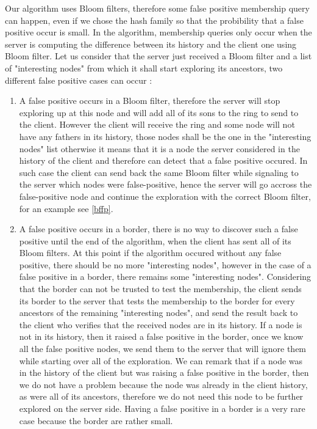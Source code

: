 Our algorithm uses Bloom filters, therefore some false positive membership query can happen, even if we chose the hash family so that the probibility that a false positive occur is small. In the algorithm, membership queries only occur when the server is computing the difference between its history and the client one using Bloom filter. Let us consider that the server just received a Bloom filter and a list of "interesting nodes" from which it shall start exploring its ancestors, two different false positive cases can occur :
\begin{enumerate}
 \item A false positive occurs in a Bloom filter, therefore the server will stop exploring up at this node and will add all of its sons to the ring to send to the client. However the client will receive the ring and some node will not have any fathers in its history, those nodes shall be the one in the "interesting nodes" list otherwise it means that it is a node the server considered in the history of the client and therefore can detect that a false positive occured. In such case the client can send back the same Bloom filter while signaling to the server which nodes were false-positive, hence the server will go accross the false-positive node and continue the exploration with the correct Bloom filter, for an example see \ref{bffp}.
 \item A false positive occurs in a border, there is no way to discover such a false positive until the end of the algorithm, when the client has sent all of its Bloom filters. At this point if the algorithm occured without any false positive, there should be no more "interesting nodes", however in the case of a false positive in a border, there remains some "interesting nodes". Considering that the border can not be trusted to test the membership, the client sends its border to the server that tests the membership to the border for every ancestors of the remaining "interesting nodes", and send the result back to the client who verifies that the received nodes are in its history. If a node is not in its history, then it raised a false positive in the border, once we know all the false positive nodes, we send them to the server that will ignore them while starting over all of the exploration. We can remark that if a node was in the history of the client but was raising a false positive in the border, then we 
do not have a problem because the node was already in the client history, as were all of its ancestors, therefore we do not need this node to be further explored on the server side. Having a false positive in a border is a very rare case because the border are rather small.
\end{enumerate}
